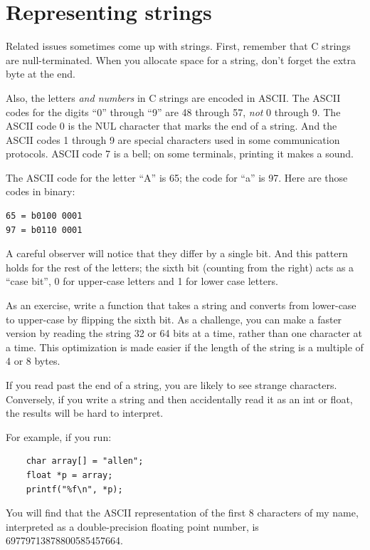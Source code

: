 \documentclass[12pt]{book}
\begin{document}
{\section{Representing strings}

Related issues sometimes come up with strings.  First, remember
that C strings are null-terminated.  When you allocate space
for a string, don't forget the extra byte at the end.

Also, the letters {\it and numbers} in C strings are
encoded in ASCII.  The ASCII codes for the digits ``0'' through ``9''
are 48 through 57, {\it not} 0 through 9.  The ASCII code 0 is the NUL
character that marks the end of a string.  And the ASCII codes 1
through 9 are special characters used in some communication protocols.
ASCII code 7 is a bell; on some terminals, printing it makes a sound.

The ASCII code for the letter ``A'' is 65; the code for
``a'' is 97.  Here are those codes in binary:

\begin{verbatim}
65 = b0100 0001
97 = b0110 0001
\end{verbatim}

A careful observer will notice that they differ by a single
bit.  And this pattern holds for the rest of the letters; the
sixth bit (counting from the right) acts as a ``case bit'', 0 for
upper-case letters and 1 for lower case letters.

As an exercise, write a function that takes a string and converts
from lower-case to upper-case by flipping the sixth bit.  As a challenge,
you can make a faster version by reading the string 32 or 64 bits
at a time, rather than one character at a time.  This optimization
is made easier if the length of the string is a multiple of 4 or
8 bytes.

If you read past the end of a string, you are likely to see
strange characters.  Conversely, if you write a string and
then accidentally read it as an int or float, the results
will be hard to interpret.

For example, if you run:

\begin{verbatim}
    char array[] = "allen";
    float *p = array;
    printf("%f\n", *p);
\end{verbatim}

You will find that the ASCII representation of the first 8 characters
of my name, interpreted as a double-precision floating point number,
is 69779713878800585457664.

}
\end{document}
